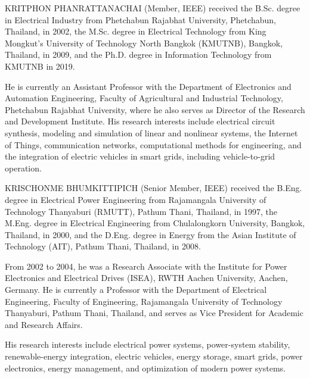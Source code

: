 \begin{IEEEbiography}{KRITPHON PHANRATTANACHAI}
(Member, IEEE) received the B.Sc. degree in Electrical Industry
from Phetchabun Rajabhat University, Phetchabun, Thailand, in 2002,
the M.Sc. degree in Electrical Technology from King Mongkut's
University of Technology North Bangkok (KMUTNB), Bangkok, Thailand,
in 2009, and the Ph.D. degree in Information Technology from KMUTNB
in 2019.

He is currently an Assistant Professor with the Department of
Electronics and Automation Engineering, Faculty of Agricultural and
Industrial Technology, Phetchabun Rajabhat University, where he also
serves as Director of the Research and Development Institute. His
research interests include electrical circuit synthesis, modeling and
simulation of linear and nonlinear systems, the Internet of Things,
communication networks, computational methods for engineering, and
the integration of electric vehicles in smart grids, including
vehicle-to-grid operation.
\end{IEEEbiography}


\begin{IEEEbiography}{KRISCHONME BHUMKITTIPICH}
(Senior Member, IEEE) received the B.Eng. degree in Electrical Power Engineering
from Rajamangala University of Technology Thanyaburi (RMUTT),
Pathum Thani, Thailand, in 1997, the M.Eng. degree in
Electrical Engineering from Chulalongkorn University,
Bangkok, Thailand, in 2000, and the D.Eng. degree in Energy
from the Asian Institute of Technology (AIT), Pathum Thani,
Thailand, in 2008.

From 2002 to 2004, he was a Research Associate with the
Institute for Power Electronics and Electrical Drives (ISEA),
RWTH Aachen University, Aachen, Germany. He is currently
a Professor with the Department of Electrical Engineering,
Faculty of Engineering, Rajamangala University of Technology
Thanyaburi, Pathum Thani, Thailand, and serves as Vice President
for Academic and Research Affairs.

His research interests include electrical power systems,
power-system stability, renewable-energy integration, electric
vehicles, energy storage, smart grids, power electronics,
energy management, and optimization of modern power systems.
\end{IEEEbiography}
